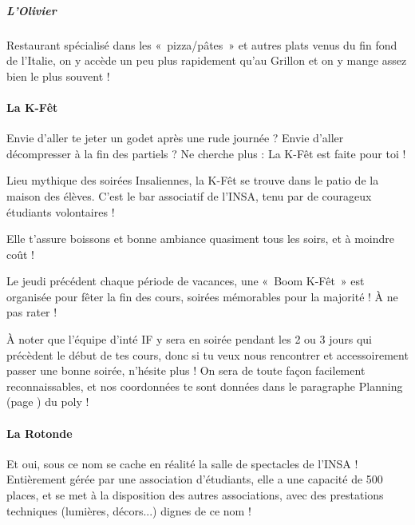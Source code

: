  \vspace{1em}
 
\subparagraph{L'Olivier}
Restaurant  spécialisé dans les «~pizza/pâtes~» et autres plats venus du fin
fond de l'Italie, on y accède un peu plus rapidement qu'au Grillon et on y
mange assez bien le plus souvent !

\paragraph{La K-Fêt}
Envie d'aller te jeter un godet après une rude journée ? Envie d'aller
décompresser à la fin des partiels ? Ne cherche plus : La K-Fêt est faite
pour toi !

\vspace{1em}

Lieu mythique des soirées Insaliennes, la K-Fêt se trouve dans le patio de
la maison des élèves. C'est le bar associatif de l'INSA, tenu par de courageux
étudiants volontaires !

\vspace{1em}

Elle t'assure boissons et bonne ambiance quasiment tous les soirs, et à
moindre coût !

\vspace{1em}

Le jeudi précédent chaque période de vacances, une «~Boom K-Fêt~» est organisée
pour fêter la fin des cours, soirées mémorables pour la majorité ! À ne
pas rater !

\vspace{1em}

À noter que l'équipe d'inté IF y sera en soirée pendant les 2 ou 3 jours qui
précèdent le début de tes cours, donc si tu veux nous rencontrer et
accessoirement passer une bonne soirée, n'hésite plus ! On sera de toute façon
facilement reconnaissables, et nos coordonnées te sont données dans le
paragraphe Planning (page \pageref{rplanning}) du poly !

\paragraph{La Rotonde}
Et oui, sous ce nom se cache en réalité la salle de spectacles de l'INSA !
Entièrement gérée par une association d'étudiants, elle a une
capacité de 500 places, et se met à la disposition des autres associations, avec
des prestations techniques (lumières, décors...) dignes de ce nom !

\vspace{1em}

